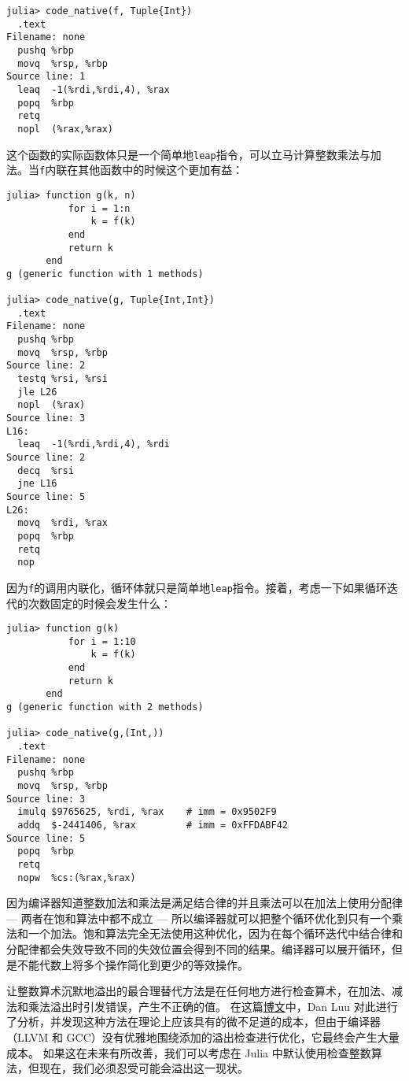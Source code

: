 \begin{verbatim}
julia> code_native(f, Tuple{Int})
  .text
Filename: none
  pushq %rbp
  movq  %rsp, %rbp
Source line: 1
  leaq  -1(%rdi,%rdi,4), %rax
  popq  %rbp
  retq
  nopl  (%rax,%rax)
\end{verbatim}



这个函数的实际函数体只是一个简单地\texttt{leap}指令，可以立马计算整数乘法与加法。当\texttt{f}内联在其他函数中的时候这个更加有益：




\begin{verbatim}
julia> function g(k, n)
           for i = 1:n
               k = f(k)
           end
           return k
       end
g (generic function with 1 methods)

julia> code_native(g, Tuple{Int,Int})
  .text
Filename: none
  pushq %rbp
  movq  %rsp, %rbp
Source line: 2
  testq %rsi, %rsi
  jle L26
  nopl  (%rax)
Source line: 3
L16:
  leaq  -1(%rdi,%rdi,4), %rdi
Source line: 2
  decq  %rsi
  jne L16
Source line: 5
L26:
  movq  %rdi, %rax
  popq  %rbp
  retq
  nop
\end{verbatim}



因为\texttt{f}的调用内联化，循环体就只是简单地\texttt{leap}指令。接着，考虑一下如果循环迭代的次数固定的时候会发生什么：




\begin{verbatim}
julia> function g(k)
           for i = 1:10
               k = f(k)
           end
           return k
       end
g (generic function with 2 methods)

julia> code_native(g,(Int,))
  .text
Filename: none
  pushq %rbp
  movq  %rsp, %rbp
Source line: 3
  imulq $9765625, %rdi, %rax    # imm = 0x9502F9
  addq  $-2441406, %rax         # imm = 0xFFDABF42
Source line: 5
  popq  %rbp
  retq
  nopw  %cs:(%rax,%rax)
\end{verbatim}



因为编译器知道整数加法和乘法是满足结合律的并且乘法可以在加法上使用分配律 — 两者在饱和算法中都不成立 — 所以编译器就可以把整个循环优化到只有一个乘法和一个加法。饱和算法完全无法使用这种优化，因为在每个循环迭代中结合律和分配律都会失效导致不同的失效位置会得到不同的结果。编译器可以展开循环，但是不能代数上将多个操作简化到更少的等效操作。



让整数算术沉默地溢出的最合理替代方法是在任何地方进行检查算术，在加法、减法和乘法溢出时引发错误，产生不正确的值。 在这篇\href{https://danluu.com/integer-overflow/}{博文}中，Dan Luu 对此进行了分析，并发现这种方法在理论上应该具有的微不足道的成本，但由于编译器（LLVM 和 GCC）没有优雅地围绕添加的溢出检查进行优化，它最终会产生大量成本。 如果这在未来有所改善，我们可以考虑在 Julia 中默认使用检查整数算法，但现在，我们必须忍受可能会溢出这一现状。



